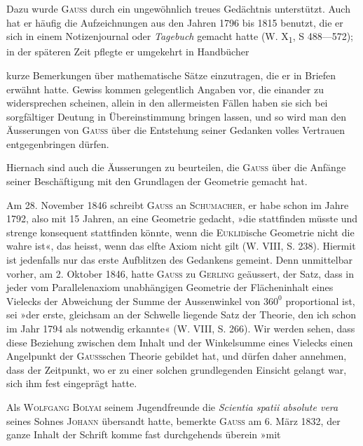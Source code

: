 Dazu wurde \textsc{Gauss} durch ein ungewöhnlich treues Gedächtnis
unterstützt. Auch hat er häufig die Aufzeichnungen aus den Jahren 1796
bis 1815 benutzt, die er sich in einem Notizenjournal oder \textit{Tagebuch} gemacht
hatte (W. X\textsubscript{1}, S 488—572); in der späteren Zeit pflegte er umgekehrt in Handbücher
\par\vfill{}
\clearpage{}
\noindent kurze Bemerkungen über mathematische Sätze einzutragen, die er in
Briefen erwähnt hatte. Gewiss kommen gelegentlich Angaben vor, die einander
zu widersprechen scheinen, allein in den allermeisten Fällen haben sie
sich bei sorgfältiger Deutung in Übereinstimmung bringen lassen, und so wird
man den Äusserungen von \textsc{Gauss} über die Entstehung seiner Gedanken volles
Vertrauen entgegenbringen dürfen.
\par
Hiernach sind auch die Äusserungen zu beurteilen, die \textsc{Gauss} über die
Anfänge seiner Beschäftigung mit den Grundlagen der Geometrie gemacht hat.
\par
Am 28. November 1846 schreibt \textsc{Gauss} an \textsc{Schumacher}, er habe schon
im Jahre 1792, also mit 15 Jahren, an eine Geometrie gedacht, »die stattfinden
müsste und strenge konsequent stattfinden könnte, wenn die \textsc{Euklid}ische
Geometrie nicht die wahre ist«, das heisst, wenn das elfte Axiom nicht gilt
(W. VIII, S. 238). Hiermit ist jedenfalls nur das erste Aufblitzen des Gedankens
gemeint. Denn unmittelbar vorher, am 2. Oktober 1846, hatte \textsc{Gauss}
zu \textsc{Gerling} geäussert, der Satz, dass in jeder vom Parallelenaxiom unabhängigen
Geometrie der Flächeninhalt eines Vielecks der Abweichung der
Summe der Aussenwinkel von \(360^0\) proportional ist, sei »der erste, gleichsam
an der Schwelle liegende Satz der Theorie, den ich schon im Jahr 1794 als
notwendig erkannte« (W. VIII, S. 266). Wir werden sehen, dass diese Beziehung
zwischen dem Inhalt und der Winkelsumme eines Vielecks einen
Angelpunkt der \textsc{Gauss}schen Theorie gebildet hat, und dürfen daher annehmen,
dass der Zeitpunkt, wo er zu einer solchen grundlegenden Einsicht gelangt
war, sich ihm fest eingeprägt hatte.
\par
Als \textsc{Wolfgang Bolyai} seinem Jugendfreunde die \textit{Scientia spatii absolute
vera} seines Sohnes \textsc{Johann} übersandt hatte, bemerkte \textsc{Gauss} am 6. März
1832, der ganze Inhalt der Schrift komme fast durchgehends überein »mit

